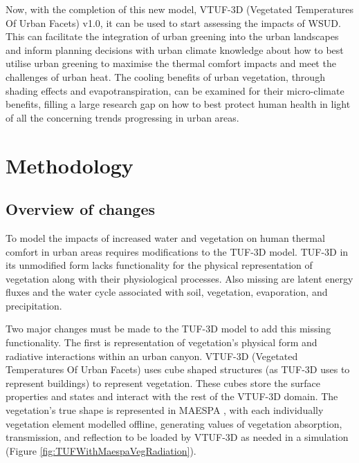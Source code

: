 \documentclass[preprint,12pt,authoryear]{elsarticle}
\begin{document}
Now, with the completion of this new model, VTUF-3D (Vegetated Temperatures Of Urban Facets) v1.0, it can be used to start assessing the impacts of WSUD. This can facilitate the integration of urban greening into the urban landscapes and inform planning decisions with urban climate knowledge about how to best utilise urban greening to maximise the thermal comfort impacts and meet the challenges of urban heat. The cooling benefits of urban vegetation, through shading effects and evapotranspiration, can be examined for their micro-climate benefits, filling a large research gap on how to best protect human health in light of all the concerning trends progressing in urban areas.

\section{Methodology}\label{sec:method}

\subsection{Overview of changes}\label{sec:DesignOverview}

To model the impacts of increased water and vegetation on human thermal comfort in urban areas requires modifications to the TUF-3D \citep{Krayenhoff2007} model. TUF-3D in its unmodified form lacks functionality for the physical representation of vegetation along with their physiological processes. Also missing are latent energy fluxes and the water cycle associated with soil, vegetation, evaporation, and precipitation. 

Two major changes must be made to the TUF-3D model to add this missing functionality. The first is representation of vegetation's physical form and radiative interactions within an urban canyon. VTUF-3D (Vegetated Temperatures Of Urban Facets) uses cube shaped structures (as TUF-3D uses to represent buildings) to represent vegetation. These cubes store the surface properties and states and interact with the rest of the VTUF-3D domain. The vegetation's true shape is represented in MAESPA \citep{Duursma2012}, with each individually vegetation element modelled offline, generating values of vegetation absorption, transmission, and reflection to be loaded by VTUF-3D as needed in a simulation (Figure \ref{fig:TUFWithMaespaVegRadiation}).  
\end{document}
